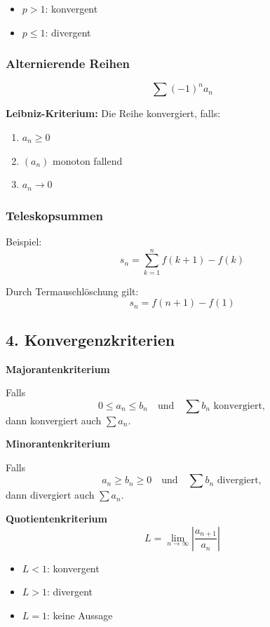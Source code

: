     \begin{itemize}
        \item $p>1$: konvergent
        \item $p \le 1$: divergent
    \end{itemize}
    
    \subsubsection{Alternierende Reihen}
    \[
    \sum (-1)^n a_n
    \]
    
    \textbf{Leibniz-Kriterium:}  
    Die Reihe konvergiert, falls:
    \begin{enumerate}
        \item $a_n \ge 0$
        \item $(a_n)$ monoton fallend
        \item $a_n \to 0$
    \end{enumerate}
    
    \subsubsection{Teleskopsummen}
    Beispiel: 
    $$s_n=\sum_{k=1}^{n}f(k+1)-f(k)$$
    
    Durch Termauschlöschung gilt:
    $$s_n=f(n+1)-f(1)$$
    
    \subsection*{4. Konvergenzkriterien}
    
    \textbf{Majorantenkriterium}
    
    Falls
    \[
    0 \le a_n \le b_n \quad \text{und} \quad \sum b_n \text{ konvergiert},
    \]
    dann konvergiert auch $\sum a_n$.
    
    \textbf{Minorantenkriterium}
    
    Falls
    \[
    a_n \ge b_n \ge 0 \quad \text{und} \quad \sum b_n \text{ divergiert},
    \]
    dann divergiert auch $\sum a_n$.
    
    \textbf{Quotientenkriterium}
    \[
    L = \lim_{n\to\infty} \left|\frac{a_{n+1}}{a_n}\right|
    \]
    
    \begin{itemize}
        \item $L<1$: konvergent
        \item $L>1$: divergent
        \item $L=1$: keine Aussage
    \end{itemize}
    
